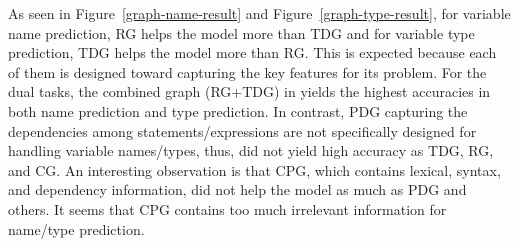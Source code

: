 As seen in Figure~\ref{graph-name-result} and
Figure~\ref{graph-type-result}, for variable name prediction, RG helps
the model more than TDG and for variable type prediction, TDG helps
the model more than RG. This is expected because each of them is
designed toward capturing the key features for its problem. For the
dual tasks, the combined graph (RG+TDG) in {\tool} yields the highest
accuracies in both name prediction and type prediction. In contrast,
PDG capturing the dependencies among statements/expressions are not
specifically designed for handling variable names/types, thus, did not
yield high accuracy as TDG, RG, and CG. An interesting observation is
that CPG, which contains lexical, syntax, and dependency information,
did not help the model as much as PDG and others. It seems that CPG
contains too much irrelevant information for name/type prediction.





